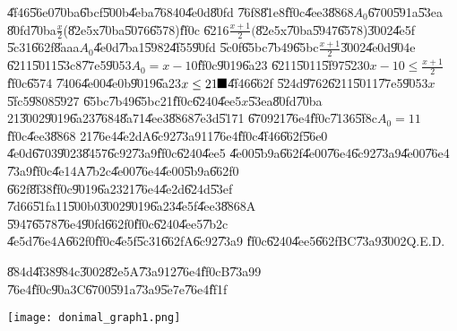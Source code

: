 \documentclass{article}
\begin{document}
\bigskip

\U{4f46}\U{56e0}\U{70ba}\U{6bcf}\U{500b}\U{4eba}\U{7684}0\U{4e0d}\U{80fd}%
\U{76f8}\U{81e8}\U{ff0c}\U{4ee3}\U{8868}$A_{0}$\U{6700}\U{591a}\U{53ea}%
\U{80fd}\U{70ba}$\frac{x}{2}$(\U{82e5}x\U{70ba}\U{5076}\U{6578})\U{ff0c}%
\U{6216}$\frac{x+1}{2}($\U{82e5}x\U{70ba}\U{5947}\U{6578})\U{3002}\U{4e5f}%
\U{5c31}\U{662f}\U{8aaa}$A_{0}$\U{4e0d}\U{7ba1}\U{5982}\U{4f55}\U{90fd}%
\U{5c0f}\U{65bc}\U{7b49}\U{65bc}$\frac{x+1}{2}$\U{3002}\U{4e0d}\U{904e}%
\U{6211}\U{5011}\U{53c8}\U{77e5}\U{9053}$A_{0}=x-10$\U{ff0c}\U{9019}\U{6a23}%
\U{6211}\U{5011}\U{5f97}\U{5230}$x-10\leq \frac{x+1}{2}$\U{ff0c}\U{6574}%
\U{7406}\U{4e00}\U{4e0b}\U{9019}\U{6a23}$x\leq 21\U{ff0c} $\U{4f46}\U{662f}%
\U{524d}\U{9762}\U{6211}\U{5011}\U{77e5}\U{9053}$x$\U{5fc5}\U{9808}\U{5927}%
\U{65bc}\U{7b49}\U{65bc}21\U{ff0c}\U{6240}\U{4ee5}$x$\U{53ea}\U{80fd}\U{70ba}%
21\U{3002}\U{9019}\U{6a23}\U{7684}\U{8a71}\U{4ee3}\U{8868}\U{7e3d}\U{5171}%
\U{6709}21\U{76e4}\U{ff0c}\U{7136}\U{5f8c}$A_{0}=11$\U{ff0c}\U{4ee3}\U{8868}%
21\U{76e4}\U{4e2d}A\U{6c92}\U{73a9}11\U{76e4}\U{ff0c}\U{4f46}\U{662f}\U{56e0}%
\U{4e0d}\U{6703}\U{9023}\U{8457}\U{6c92}\U{73a9}\U{ff0c}\U{6240}\U{4ee5}%
\U{4e00}\U{5b9a}\U{662f}\U{4e00}\U{76e4}\U{6c92}\U{73a9}\U{4e00}\U{76e4}%
\U{73a9}\U{ff0c}\U{4e14}A\U{7b2c}\U{4e00}\U{76e4}\U{4e00}\U{5b9a}\U{662f}0%
\U{662f}\U{8f38}\U{ff0c}\U{9019}\U{6a23}21\U{76e4}\U{4e2d}\U{624d}\U{53ef}%
\U{7d66}\U{51fa}11\U{500b}0\U{3002}\U{9019}\U{6a23}\U{4e5f}\U{4ee3}\U{8868}A%
\U{5947}\U{6578}\U{76e4}\U{90fd}\U{662f}0\U{ff0c}\U{6240}\U{4ee5}\U{7b2c}%
\U{4e5d}\U{76e4}A\U{662f}0\U{ff0c}\U{4e5f}\U{5c31}\U{662f}A\U{6c92}\U{73a9}%
\U{ff0c}\U{6240}\U{4ee5}\U{662f}BC\U{73a9}\U{3002}Q.E.D.

\bigskip

\U{884d}\U{4f38}\U{984c}\U{3002}\U{82e5}A\U{73a9}12\U{76e4}\U{ff0c}B\U{73a9}9%
\U{76e4}\U{ff0c}\U{90a3}C\U{6700}\U{591a}\U{73a9}\U{5e7e}\U{76e4}\U{ff1f}

\newpage

\begin{center}
\texttt{[image: donimal\_graph1.png]}
\end{center}%
\end{document}
